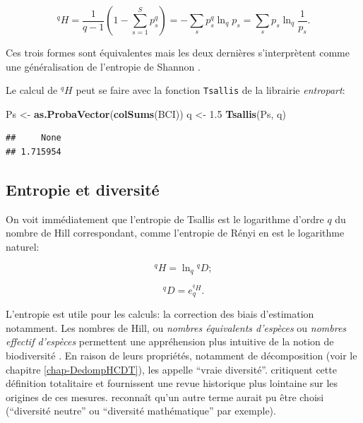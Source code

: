 \documentclass[
  11pt,
  french,
  a4paper,
  extrafontsizes,onecolumn,openright
  ]{memoir}
\newenvironment{Shaded}{\begin{snugshade}}{\end{snugshade}}
\newcommand{\FloatTok}[1]{\textcolor[rgb]{0.00,0.00,0.81}{#1}}
\newcommand{\FunctionTok}[1]{\textcolor[rgb]{0.13,0.29,0.53}{\textbf{#1}}}
\newcommand{\NormalTok}[1]{#1}
\newcommand{\OtherTok}[1]{\textcolor[rgb]{0.56,0.35,0.01}{#1}}
\begin{document}
\begin{equation}
  \label{eq:EntropieHCDT}
  ^{q}\!H = \frac{1}{q-1}\left(1-\sum^S_{s=1}{p^q_s}\right)=-\sum_s{p^q_s}\ln_q{p_s}=\sum_s{p_s}\ln_q\frac{1}{p_s}.
\end{equation}

Ces trois formes sont équivalentes mais les deux dernières s'interprètent comme une généralisation de l'entropie de Shannon \autocite{Marcon2014a}.

Le calcul de \(^{q}\!H\) peut se faire avec la fonction \texttt{Tsallis} de la librairie \emph{entropart}:

\scriptsize

\begin{Shaded}
\begin{Highlighting}[]
\NormalTok{Ps }\OtherTok{\textless{}{-}} \FunctionTok{as.ProbaVector}\NormalTok{(}\FunctionTok{colSums}\NormalTok{(BCI))}
\NormalTok{q }\OtherTok{\textless{}{-}} \FloatTok{1.5}
\FunctionTok{Tsallis}\NormalTok{(Ps, q)}
\end{Highlighting}
\end{Shaded}

\begin{verbatim}
##     None 
## 1.715954
\end{verbatim}

\normalsize

\subsection{Entropie et diversité}\label{entropie-et-diversituxe9}

On voit immédiatement que l'entropie de Tsallis est le logarithme d'ordre \(q\) du nombre de Hill correspondant, comme l'entropie de Rényi en est le logarithme naturel:

\begin{equation}
  \label{eq:HlnD}
  ^{q}\!H = \ln_q{^{q}\!D};
\end{equation}

\begin{equation}
  \label{eq:DexpH}
  ^{q}\!D = e_q^{^{q}\!H}.
\end{equation}

L'entropie est utile pour les calculs: la correction des biais d'estimation notamment.
Les nombres de Hill, ou \emph{nombres équivalents d'espèces} ou \emph{nombres effectif d'espèces} permettent une appréhension plus intuitive de la notion de biodiversité \autocite{Jost2006}.
En raison de leurs propriétés, notamment de décomposition (voir le chapitre \ref{chap-DedompHCDT}), \textcite{Jost2007} les appelle ``vraie diversité''.
\textcite{Hoffmann2008} critiquent cette définition totalitaire et fournissent une revue historique plus lointaine sur les origines de ces mesures.
\textcite{Jost2009} reconnaît qu'un autre terme aurait pu être choisi (``diversité neutre'' ou ``diversité mathématique'' par exemple).
\end{document}
